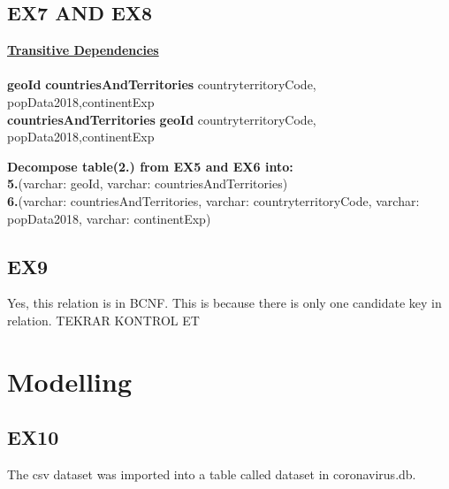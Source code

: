 \documentclass[12pt]{extarticle}
\begin{document}
    \vspace{1.4cm}
    \subsection{EX7 AND EX8}
    \vspace{0.4cm}
    \underline{\textbf{Transitive Dependencies}}
    \\\\\textbf{geoId} \to \textbf{countriesAndTerritories} \to countryterritoryCode, popData2018,continentExp
    \\\textbf{countriesAndTerritories} \to \textbf{geoId} \to countryterritoryCode, popData2018,continentExp
    \newline
    
    \textbf{Decompose table(2.) from EX5 and EX6 into:}
    \\\textbf{5.}(varchar: geoId, varchar: countriesAndTerritories)
    \\\textbf{6.}(varchar: countriesAndTerritories, varchar: countryterritoryCode, varchar: popData2018, varchar: continentExp)
    
    
    \vspace{0.4cm}
    \subsection{EX9}
    \vspace{0.4cm}
    Yes, this relation is in BCNF. This is because there is only one candidate key in relation. TEKRAR KONTROL ET
    
\vspace{1cm}
\section{Modelling}
    \vspace{0.4cm}
    \subsection{EX10}
    The csv dataset was imported into a table called dataset in coronavirus.db.
    
    
\end{document}
